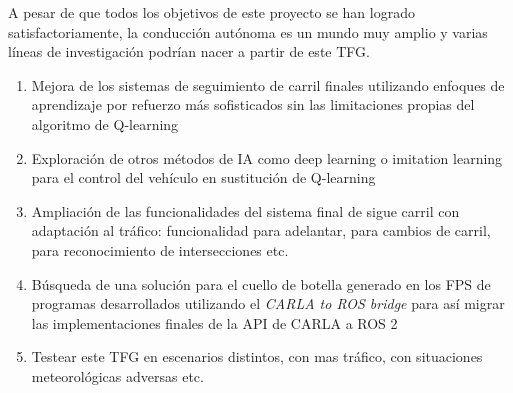 A pesar de que todos los objetivos de este proyecto se han logrado satisfactoriamente, la conducción autónoma es un mundo muy amplio y varias líneas de investigación podrían nacer a partir de este \ac{TFG}.
\begin{enumerate}
	\item Mejora de los sistemas de seguimiento de carril finales utilizando enfoques de aprendizaje por refuerzo más sofisticados sin las limitaciones propias del algoritmo de Q-learning
	\item Exploración de otros métodos de \ac{IA} como deep learning o imitation learning para el control del vehículo en sustitución de Q-learning
	\item Ampliación de las funcionalidades del sistema final de sigue carril con adaptación al tráfico: funcionalidad para adelantar, para cambios de carril, para reconocimiento de intersecciones etc.
	\item Búsqueda de una solución para el cuello de botella generado en los \ac{FPS} de programas desarrollados utilizando el \textit{CARLA to ROS bridge} para así migrar las implementaciones finales de la \ac{API} de CARLA a ROS 2
	\item Testear este \ac{TFG} en escenarios distintos, con mas tráfico, con situaciones meteorológicas adversas etc.
\end{enumerate}


